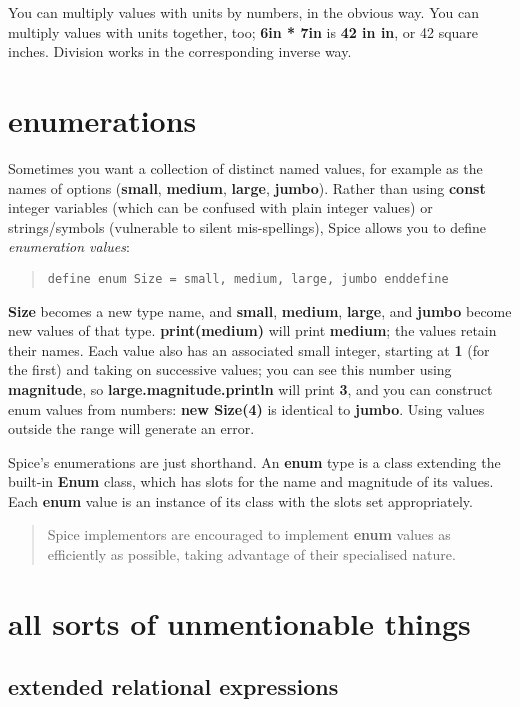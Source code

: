 \documentclass{report}
\begin{document}
You can multiply values with units by numbers, in the obvious way. You can
multiply values with units together, too; {\bf 6in * 7in} is {\bf 42 in in}, or
42 square inches. Division works in the corresponding inverse way.\chapter{enumerations}


Sometimes you want a collection of distinct named values, for example as
the names of options ({\bf small}, {\bf medium}, {\bf large}, {\bf jumbo}). Rather than using
{\bf const} integer variables (which can be confused with plain integer values) or
strings/symbols (vulnerable to silent mis-spellings), Spice allows you to
define {\em enumeration values}:

\begin{quote}
\begin{verbatim}
define enum Size = small, medium, large, jumbo enddefine
\end{verbatim}
\end{quote}


{\bf Size} becomes a new type name, and {\bf small}, {\bf medium}, {\bf large}, and {\bf jumbo}
become new values of that type. {\bf print(medium)} will print {\bf medium}; the
values retain their names. Each value also has an associated small integer,
starting at {\bf 1} (for the first) and taking on successive values; you can see
this number using {\bf magnitude}, so {\bf large.magnitude.println} will print {\bf 3},
and you can construct enum values from numbers: {\bf new Size(4)} is identical to
{\bf jumbo}. Using values outside the range will generate an error.

Spice's enumerations are just shorthand. An {\bf enum} type is a class
extending the built-in {\bf Enum} class, which has slots for the name and
magnitude of its values. Each {\bf enum} value is an instance of its class
with the slots set appropriately.

\begin{quote}Spice implementors are encouraged to implement {\bf enum} values as efficiently as
possible, taking advantage of their specialised nature.
\end{quote}\chapter{all sorts of unmentionable things}


\section{extended relational expressions}
\end{document}

